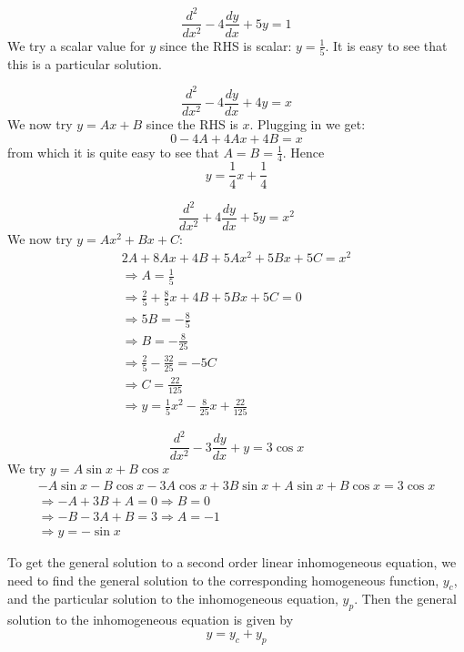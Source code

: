 \documentclass[a4paper,10pt]{article}
\begin{document}
\begin{ex}
	\[
		\frac{d^2}{dx^2} - 4\frac{dy}{dx} + 5y = 1
	\]
	We try a scalar value for $y$ since the RHS is scalar: $y =
	\frac{1}{5}$. It is easy to see that this is a particular
	solution.
\end{ex}

\begin{ex}
	\[
		\frac{d^2}{dx^2} - 4\frac{dy}{dx} + 4y = x
	\]
	We now try $y = Ax+B$ since the RHS is $x$. Plugging in we get:
	\[
		0 - 4A + 4Ax + 4B = x
	\]
	from which it is quite easy to see that $A = B = \frac{1}{4}$. Hence
	\[
		y = \frac{1}{4}x + \frac{1}{4}
	\]
\end{ex}

\begin{ex}
	\[
		\frac{d^2}{dx^2} + 4\frac{dy}{dx} + 5y = x^2
	\]
	We now try $y = Ax^2 + Bx + C$:
	\begin{gather*}
		2A + 8Ax + 4B + 5Ax^2 + 5Bx + 5C = x^2 \\
		\Rightarrow A = \frac{1}{5} \\
		\Rightarrow \frac{2}{5} + \frac{8}{5}x + 4B + 5Bx + 5C = 0 \\
		\Rightarrow 5B = -\frac{8}{5} \\
		\Rightarrow B = -\frac{8}{25} \\
		\Rightarrow \frac{2}{5} - \frac{32}{25} = -5C \\
		\Rightarrow C = \frac{22}{125} \\
		\Rightarrow y = \frac{1}{5}x^2 - \frac{8}{25} x + \frac{22}{125}
	\end{gather*}
\end{ex}

\begin{ex}
	\[
		\frac{d^2}{dx^2} - 3\frac{dy}{dx} + y = 3\cos x
	\]
	We try $y = A\sin x + B \cos x$
	\begin{gather*}
		-A\sin x - B\cos x - 3A\cos x + 3B\sin x + A\sin x + B\cos x
		= 3\cos x \\
		\Rightarrow -A + 3B + A = 0 \Rightarrow B = 0 \\
		\Rightarrow -B - 3A + B = 3 \Rightarrow A = -1 \\
		\Rightarrow y = -\sin x
	\end{gather*}
\end{ex}

To get the general solution to a second order linear inhomogeneous
equation, we need to find the general solution to the corresponding
homogeneous function, $y_c$, and the particular solution to the
inhomogeneous equation, $y_p$. Then the general solution to the
inhomogeneous equation is given by
\[
	y = y_c + y_p
\]
\end{document}
